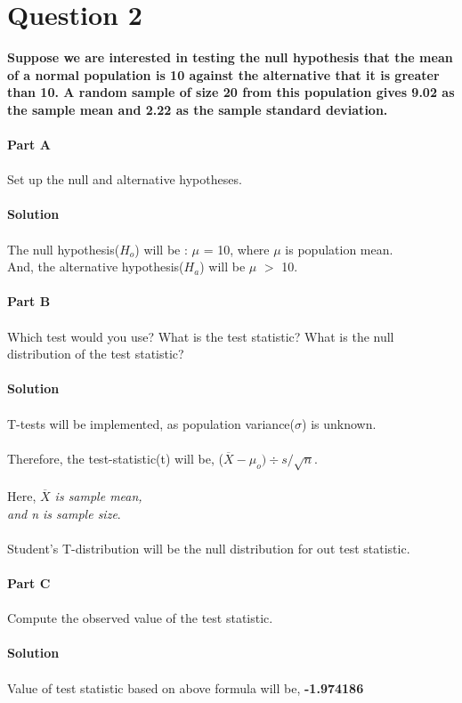 \documentclass[12pt,a4paper]{report}
\begin{document}
\section{Question 2}
\textbf{Suppose we are interested in testing the null hypothesis that the mean of a normal population is 10 against the alternative that it is greater than 10. A random sample of size 20 from this population gives 9.02 as the sample mean and 2.22 as the sample standard deviation.}
\\\\
\textbf{Part A}
\\\\
Set up the null and alternative hypotheses.
\\\\
\textbf{Solution}\\\\
The null hypothesis($H_o$) will be : $\mu$ = 10, where $\mu$ is population mean.\\
And, the alternative hypothesis($H_a$) will be $\mu$ $>$ 10.
\\\\
\textbf{Part B}
\\\\
Which test would you use? What is the test statistic? What is the null distribution of the test statistic?
\\\\
\textbf{Solution}
\\\\
T-tests will be implemented, as population variance($\sigma$) is unknown.\\\\
Therefore, the test-statistic(t) will be, ($\overline{X} - \mu _o) \div s/\sqrt{n}$.\\\\
Here, \textit{$\overline{X}$ is sample mean,\\ and n is sample size}.\\\\
Student's T-distribution will be the null distribution for out test statistic.
\\\\
\textbf{Part C}
\\\\
Compute the observed value of the test statistic.
\\\\
\textbf{Solution}
\\\\
Value of test statistic based on above formula will be, \textbf{-1.974186}
\end{document}

